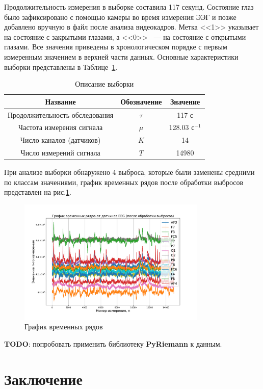 \documentclass[a4paper, 12pt]{extarticle}
\begin{document}
Продолжительность измерения в выборке составила 117 секунд. 
Состояние глаз было зафиксировано с помощью камеры во время измерения ЭЭГ и позже добавлено 
вручную в файл после анализа видеокадров. Метка <<1>> указывает на состояние с закрытыми глазами, а 
<<0>> ~--- на состояние с открытыми глазами. Все значения приведены в хронологическом порядке с 
первым измеренным значением в верхней части данных.
Основные характеристики выборки представлены в
Таблице~\ref{table:sample}.

\begin{table}
	\centering
	\caption{Описание выборки}
	\begin{tabular}{|c|c|c|}
		\hline
		Название                       & Обозначение & Значение             \\
		\hline \hline
		Продолжительность обследования & $\tau$         & 117 с                \\ \hline
		Частота измерения сигнала      & $\mu$       & 128.03 $\text{с}^{-1}$   \\ \hline
	    Число каналов (датчиков)    & $K$   & 14          \\ \hline
		Число измерений сигнала             & $T$  & 14980           \\ \hline
	\end{tabular}
	\label{table:sample}
\end{table}
При анализе выборки обнаружено 4 выброса, которые были заменены средними по классам 
значениями, график временных рядов после обработки выбросов представлен на рис.\ref{fig:2}.

\begin{figure}[h]
	\centering
	\includegraphics[width=0.8\textwidth]{Dataset.pdf}
	\caption{График временных рядов}
	\label{fig:2}
\end{figure}


\textbf{TODO}: попробовать применить библиотеку \textbf{PyRiemann} к данным.

\section{Заключение}


\newpage



\end{document}
